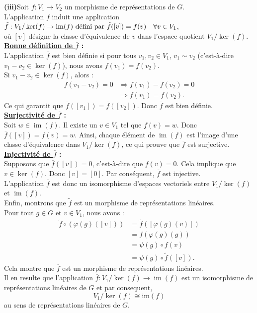 \documentclass[a4paper, 14pt]{report}
\begin{document}
\begin{onehalfspace}
{\textbf{(iii)}Soit \( f : V_1 \to V_2 \) un morphisme de représentations de \( G \).\\
L'application \( f \) induit une application \\
\( \tilde{f}: V_1 / \ker(f) \to \operatorname{im}(f)$ défini par $\tilde{f}([v]) = f(v) \quad \forall v \in V_1 \), \\
où \( [v] \) désigne la classe d'équivalence de \( v \) dans l'espace quotient \( V_1 / \ker(f) \).\\

\textbf{\underline{Bonne définition de \( \overline{f} \)} :}\\
L'application \( \overline{f} \) est bien définie si pour tous \( v_1, v_2 \in V_1 \), \( v_1 \sim v_2 \) (c'est-à-dire \( v_1 - v_2 \in \ker(f) \)), nous avons \( f(v_1) = f(v_2) \).\\
Si \( v_1 - v_2 \in \ker(f) \), alors :
\[
\begin{aligned}
	f(v_1-v_2)=0 & \Rightarrow f(v_1)-f(v_2)=0 \\
	&\Rightarrow f(v_1)=f(v_2).
\end{aligned}
\]
Ce qui garantit que \( \overline{f}([v_1]) = \overline{f}([v_2]) \). Donc \( \overline{f} \) est bien définie.\\

\textbf{\underline{Surjectivité de \( \overline{f} \)} :}\\
Soit \( w \in \operatorname{im}(f) \). Il existe un \( v \in V_1 \) tel que \( f(v) = w \). Donc \( \overline{f}([v]) = f(v) = w \). Ainsi, chaque élément de \( \operatorname{im}(f) \) est l'image d'une classe d'équivalence dans \( V_1 / \ker(f) \), ce qui prouve que \( \overline{f} \) est surjective.\\

\textbf{\underline{Injectivité de \( \overline{f} \)} :}\\
Supposons que \( \overline{f}([v]) = 0 \), c'est-à-dire que \( f(v) = 0 \). Cela implique que \( v \in \ker(f) \). Donc \( [v] = [0] \). Par conséquent, \( \overline{f} \) est injective.\\
L'application \( \overline{f} \) est donc un isomorphisme d'espaces vectoriels entre \( V_1 / \ker(f) \) et \( \operatorname{im}(f) \).\\
Enfin, montrons que $\tilde{f}$ est un morphisme de représentations linéaires. \\
Pour tout $g \in G$ et $v \in V_1$, nous avons :
\[
\begin{aligned}
	\tilde{f} \circ (\varphi(g) ([v])) &= \tilde{f}([\varphi(g) (v)])\\
	&= f(\varphi(g) (g)) \\
	&= \psi(g) \circ f(v) \\
	&= \psi(g) \circ\tilde{f}([v]).
\end{aligned}
\]
Cela montre que \( \overline{f} \) est un morphisme de représentations linéaires.\\
Il en resulte que l'application \( \overline{f} : V_1 / \ker(f) \to \operatorname{im}(f) \) est un isomorphisme de représentations linéaires de \( G \) et par consequent,
\[ V_1 / \ker(f) \cong \mathrm{im}(f) \] 
au sens de représentations linéaires de \(G\).	


}
\end{onehalfspace}
\end{document}

